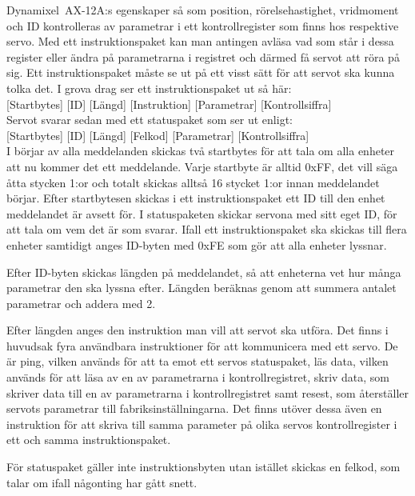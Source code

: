 \documentclass[a4paper,12pt]{article}
\begin{document}
Dynamixel~AX-12A:s egenskaper så som position, rörelsehastighet, vridmoment och ID kontrolleras av parametrar i ett kontrollregister som finns hos respektive servo. Med ett instruktionspaket kan man antingen avläsa vad som står i dessa register eller ändra på parametrarna i registret och därmed få servot att röra på sig. Ett instruktionspaket måste se ut på ett visst sätt för att servot ska kunna tolka det. I grova drag ser ett instruktionspaket ut så här:\\

[Startbytes] [ID] [Längd] [Instruktion] [Parametrar] [Kontrollsiffra]\\

Servot svarar sedan med ett statuspaket som ser ut enligt:\\

[Startbytes] [ID] [Längd] [Felkod] [Parametrar] [Kontrollsiffra]\\

I börjar av alla meddelanden skickas två startbytes för att tala om alla enheter att nu kommer det ett meddelande. Varje startbyte är alltid 0xFF, det vill säga åtta stycken 1:or och totalt skickas alltså 16 stycket 1:or innan meddelandet börjar. Efter startbytesen skickas i ett instruktionspaket ett ID till den enhet meddelandet är avsett för. I statuspaketen skickar servona med sitt eget ID, för att tala om vem det är som svarar. Ifall ett instruktionspaket ska skickas till flera enheter samtidigt anges ID-byten med 0xFE som gör att alla enheter lyssnar. 

Efter ID-byten skickas längden på meddelandet, så att enheterna vet hur många parametrar den ska lyssna efter. Längden beräknas genom att summera antalet parametrar och addera med 2.

 Efter längden anges den instruktion man vill att servot ska utföra. Det finns i huvudsak fyra användbara instruktioner för att kommunicera med ett servo. De är ping, vilken används för att ta emot ett servos statuspaket, läs data, vilken används för att läsa av en av parametrarna i kontrollregistret, skriv data, som skriver data till en av parametrarna i kontrollregistret samt resest, som återställer servots parametrar till fabriksinställningarna. Det finns utöver dessa även en instruktion för att skriva till samma parameter på olika servos kontrollregister i ett och samma instruktionspaket. 

För statuspaket gäller inte instruktionsbyten utan istället skickas en felkod, som talar om ifall någonting har gått snett.
\end{document}
